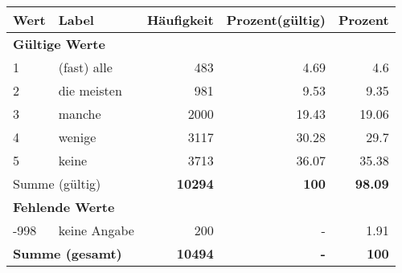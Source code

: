      \begin{longtable}{lXrrr}
     \toprule
     \textbf{Wert} & \textbf{Label} & \textbf{Häufigkeit} & \textbf{Prozent(gültig)} & \textbf{Prozent} \\
     \endhead
     \midrule
     \multicolumn{5}{l}{\textbf{Gültige Werte}}\\

     1 &
     \multicolumn{1}{X}{ (fast) alle   } &


       \num{483} &
       \num[round-mode=places,round-precision=2]{4,69} &
         \num[round-mode=places,round-precision=2]{4,6} \\

     2 &
     \multicolumn{1}{X}{ die meisten   } &


       \num{981} &
       \num[round-mode=places,round-precision=2]{9,53} &
         \num[round-mode=places,round-precision=2]{9,35} \\

     3 &
     \multicolumn{1}{X}{ manche   } &


       \num{2000} &
       \num[round-mode=places,round-precision=2]{19,43} &
         \num[round-mode=places,round-precision=2]{19,06} \\

     4 &
     \multicolumn{1}{X}{ wenige   } &


       \num{3117} &
       \num[round-mode=places,round-precision=2]{30,28} &
         \num[round-mode=places,round-precision=2]{29,7} \\

     5 &
     \multicolumn{1}{X}{ keine   } &


       \num{3713} &
       \num[round-mode=places,round-precision=2]{36,07} &
         \num[round-mode=places,round-precision=2]{35,38} \\
     \midrule
     \multicolumn{2}{l}{Summe (gültig)} &
       \textbf{\num{10294}} &
     \textbf{100} &
       \textbf{\num[round-mode=places,round-precision=2]{98,09}} \\
     \multicolumn{5}{l}{\textbf{Fehlende Werte}}\\
       -998 &
       keine Angabe &
         \num{200} &
        - &
         \num[round-mode=places,round-precision=2]{1,91} \\
     \midrule
     \multicolumn{2}{l}{\textbf{Summe (gesamt)}} &
          \textbf{\num{10494}} &
        \textbf{-} &
        \textbf{100} \\
     \bottomrule
     \end{longtable}
     
